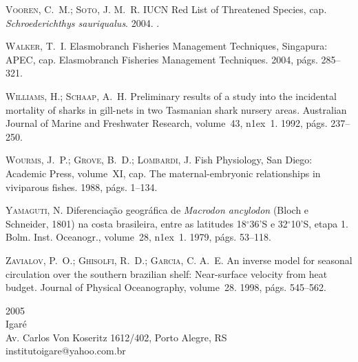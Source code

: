\documentclass[a4paper,11pt,twoside,showtrims,onecolumn,openright,final]{memoir}
\begin{document}
\begin{thebibliography}{194}
\textsc{Vooren, C.~M.; Soto, J. M.~R.}
 {IUCN} {R}ed {L}ist of {T}hreatened {S}pecies, cap.
  \emph{Schroederichthys sauriqualus}. 2004.
.

\textsc{Walker, T.~I.}
\newblock Elasmobranch {F}isheries {M}anagement {T}echniques, Singapura: APEC,
  cap. Elasmobranch Fisheries Management Techniques. 2004, p\'ags. 285--321.

\textsc{Williams, H.; Schaap, A.~H.}
\newblock Preliminary results of a study into the incidental mortality of
  sharks in gill-nets in two {T}asmanian shark nursery areas.
\newblock Australian Journal of Marine and Freshwater Research, volume~43,
  n\raise1ex\hbox{}~1. 1992, p\'ags. 237--250.

\textsc{Wourms, J.~P.; Grove, B.~D.; Lombardi, J.}
\newblock Fish {P}hysiology, San Diego: Academic Press, volume~XI, cap. The
  maternal-embryonic relationships in viviparous fishes. 1988, p\'ags. 1--134.

\textsc{Yamaguti, N.}
\newblock Diferencia\c{c}\~ao geogr\'afica de \emph{{M}acrodon ancylodon} ({B}loch e
  {S}chneider, 1801) na costa brasileira, entre as latitudes
  18\mbox{$^\circ$}36'{S} e 32\mbox{$^\circ$}10'{S}, etapa 1.
\newblock Bolm. Inst. Oceanogr., volume~28,
  n\raise1ex\hbox{}~1. 1979, p\'ags. 53--118.

\textsc{Zavialov, P.~O.; Ghisolfi, R.~D.; Garcia, C. A.~E.}
\newblock An inverse model for seasonal circulation over the southern brazilian
  shelf: Near-surface velocity from heat budget.
\newblock Journal of Physical Oceanography, volume~28. 1998, p\'ags. 545--562.

\end{thebibliography}




\cleartoverso
\pagestyle{empty}



\begin{center}
\begin{tiny}

\vspace*{18cm}

2005 \\
Igaré \\
Av. Carlos Von Koseritz 1612/402, Porto Alegre, RS \\
institutoigare@yahoo.com.br \\

\end{tiny}
\end{center}




\end{document}
